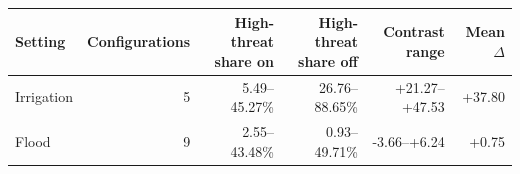 \begin{tabular}{lrrrrr}
\toprule
Setting & Configurations & High-threat share on & High-threat share off & Contrast range & Mean $\Delta$ \\
\midrule
Irrigation & 5 & 5.49--45.27\% & 26.76--88.65\% & +21.27--+47.53 & +37.80 \\
Flood & 9 & 2.55--43.48\% & 0.93--49.71\% & -3.66--+6.24 & +0.75 \\
\bottomrule
\end{tabular}
